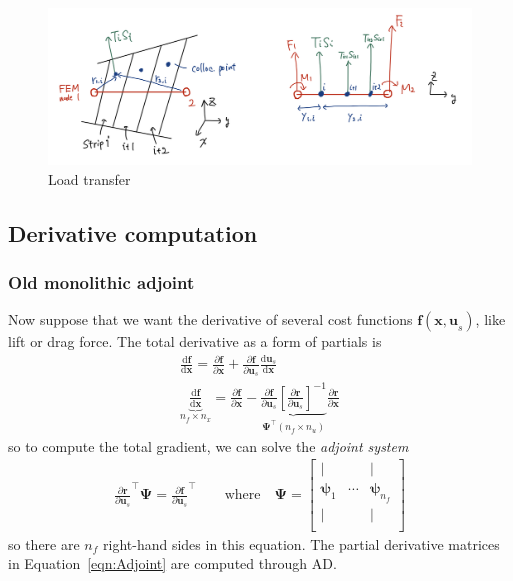 \documentclass[10pt]{article}
\newcommand{\pp}[2]{\frac{\partial #1}{\partial #2}}
\newcommand{\dd}[2]{\frac{\textrm{d} #1}{\textrm{d} #2}}
\newcommand{\mb}[1]{\boldsymbol{\mathbf{#1}}} %
\newcommand{\mbf}[1]{\mathbf{#1}}
\newcommand{\be}{\begin{eqnarray}}
\newcommand{\ee}{\end{eqnarray}}
\newcommand{\beq}{\begin{equation}\begin{aligned}}
\newcommand{\eeq}{\end{aligned}\end{equation}}
\newcommand{\tn}[1]{\textrm{#1}}
\begin{document}
\begin{figure}[t]
    \centering
    \includegraphics[width=0.7\columnwidth]{load_transfer_draft.png}
    \caption{Load transfer}
    \label{fig:load_transfer}
\end{figure}



\subsection{Derivative computation}
% 
\subsubsection{Old monolithic adjoint}
% 
Now suppose that we want the derivative of several cost functions $\mbf{f}(\mbf{x,u}_s)$, like lift or drag force.
The total derivative as a form of partials \cite[Sec. 6.7.2]{Martins2022} is
\be
\dd{\mbf{f}}{\mbf{x}} =
\pp{\mbf{f}}{\mbf{x}} + \pp{\mbf{f}}{\mbf{u}_s} \dd{\mbf{u}_s}{\mbf{x}}
\\
\label{eqn:Adjoint}
\boxed{
	\underbrace{
		\dd{ \mbf{f}}{\mbf{x}}
	}_{n_f \times n_x}
	= \pp{\mbf{f}}{\mbf{x}}
	-
	\underbrace{\pp{\mbf{f}}{\mbf{u}_s} \left[\pp{\mbf{r}}{\mbf{u}_s}\right]^{-1}
	}_{\boldsymbol{\Psi^\top} (n_f \times n_u)}
	\pp{\mbf{r}}{\mbf{x}}
}
\ee
so to compute the total gradient, we can solve the \emph{adjoint system}
\be
\pp{\mbf{r}}{\mbf{u}_s}^\top \boldsymbol{\Psi}
=
\pp{\mbf{f}}{\mbf{u}_s}^\top
\qquad
\tn{where}
\quad
\boldsymbol{\Psi} = \begin{bmatrix}
	|                   &        & |                       \\
	\boldsymbol{\psi}_1 & \cdots & \boldsymbol{\psi}_{n_f} \\
	|                   &        & |                       \\
\end{bmatrix}
\ee
so there are $n_f$ right-hand sides in this equation.
The partial derivative matrices in Equation~\eqref{eqn:Adjoint} are computed through \ac{AD}.
\end{document}
